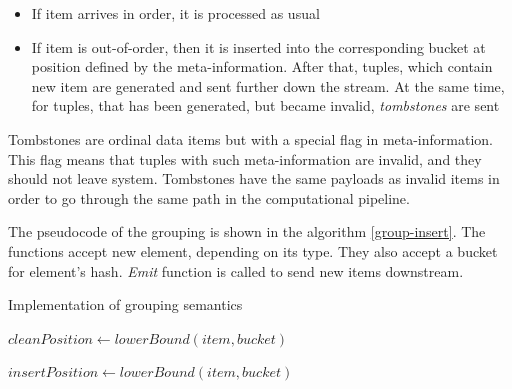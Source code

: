 \begin{itemize}
    \item If item arrives in order, it is processed as usual
    \item If item is out-of-order, then it is inserted into the corresponding bucket at position defined by the meta-information. After that, tuples, which contain new item are generated and sent further down the stream. At the same time, for tuples, that has been generated, but became invalid, {\it tombstones} are sent
\end{itemize}

Tombstones are ordinal data items but with a special flag in meta-information. This flag means that tuples with such meta-information are invalid, and they should not leave system. Tombstones have the same payloads as invalid items in order to go through the same path in the computational pipeline.

The pseudocode of the grouping is shown in the algorithm \ref{group-insert}. The functions accept new element, depending on its type. They also accept a bucket for element's hash. {\it Emit} function is called to send new items downstream.

\begin{algorithm}
\caption{Implementation of grouping semantics}
\label{group-insert}
  \begin{algorithmic}[1]
      \State $cleanPosition \gets lowerBound(item, bucket)$
        \State {}
      \EndFor

      \State {}

        \State {} 
      \EndFor
    \EndFunction

    \State

      \State $insertPosition \gets lowerBound(item, bucket)$
        \State {} 
      \EndFor
      
      \State {}

        \State {} 
      \EndFor
    \EndFunction
  \end{algorithmic}
\end{algorithm}

